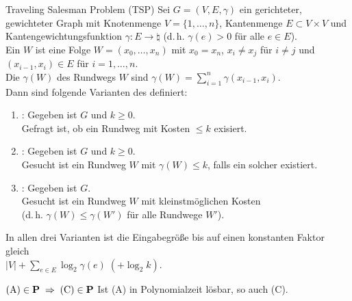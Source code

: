 \begin{Def}{Traveling Salesman Problem (TSP)}
    Sei $G = (V, E, \gamma)$ ein gerichteter, gewichteter Graph mit Knotenmenge
    $V = \{1, \dotsc, n\}$, Kantenmenge $E \subset V \times V$ und Kantengewichtungsfunktion
    $\gamma\colon E \rightarrow \natural$ (d.\,h. $\gamma(e) > 0$ für alle $e \in E$).\\
    Ein  $W$ ist eine Folge $W = (x_0, \dotsc, x_n)$ mit
    $x_0 = x_n$, $x_i \not= x_j$ für $i \not= j$ und
    $(x_{i-1}, x_i) \in E$ für $i = 1, \dotsc, n$.\\
    Die  $\gamma(W)$ des Rundwegs $W$ sind
    $\gamma(W) = \sum_{i=1}^n \gamma(x_{i-1}, x_i)$.\\
    Dann sind folgende Varianten des  definiert:
    \begin{enumerate}[label=(\Alph*)]
        \item
        :
        Gegeben ist $G$ und $k \ge 0$.\\
        Gefragt ist, ob ein Rundweg mit Kosten $\le k$ exisiert.

        \item
        :
        Gegeben ist $G$ und $k \ge 0$.\\
        Gesucht ist ein Rundweg $W$ mit $\gamma(W) \le k$, falls ein solcher existiert.

        \item
        :
        Gegeben ist $G$.\\
        Gesucht ist ein Rundweg $W$ mit kleinstmöglichen Kosten\\
        (d.\,h. $\gamma(W) \le \gamma(W')$ für alle Rundwege $W'$).
    \end{enumerate}
    In allen drei Varianten ist die Eingabegröße bis auf einen konstanten Faktor gleich\\
    $|V| + \sum_{e \in E} \log_2 \gamma(e) \;(+ \log_2 k)$.
\end{Def}

\linie
\pagebreak

\begin{Satz}{$\text{(A)} \in \P \;\Rightarrow\; \text{(C)} \in \P$}
    Ist (A) in Polynomialzeit lösbar, so auch (C).
\end{Satz}

